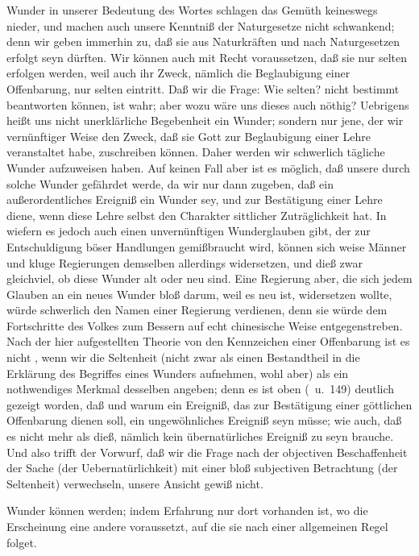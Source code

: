  Wunder in unserer Bedeutung des Wortes schlagen das Gemüth keineswegs nieder, und machen auch unsere Kenntniß der Naturgesetze nicht schwankend; denn wir geben immerhin zu, daß sie aus Naturkräften und nach Naturgesetzen erfolgt seyn dürften. Wir können auch mit Recht voraussetzen, daß sie nur selten erfolgen werden, weil auch ihr Zweck, nämlich die Beglaubigung einer Offenbarung, nur selten eintritt. Daß wir die Frage: Wie selten? nicht bestimmt beantworten können, ist wahr; aber wozu wäre uns dieses auch nöthig? Uebrigens heißt uns nicht  unerklärliche Begebenheit ein Wunder; sondern nur jene, der wir vernünftiger Weise den Zweck, daß sie Gott zur Beglaubigung einer Lehre veranstaltet habe, zuschreiben können. Daher werden wir schwerlich tägliche Wunder aufzuweisen haben. Auf keinen Fall aber ist es möglich, daß unsere  durch solche Wunder gefährdet werde, da wir nur dann zugeben, daß ein außerordentliches Ereigniß ein Wunder sey, und zur Bestätigung einer Lehre diene, wenn diese Lehre selbst den Charakter sittlicher Zuträglichkeit hat. In wiefern es jedoch auch einen unvernünftigen Wunderglauben gibt, der zur Entschuldigung böser Handlungen gemißbraucht wird, können sich weise Männer und kluge Regierungen demselben allerdings widersetzen, und dieß zwar gleichviel, ob diese Wunder alt oder neu sind. Eine Regierung aber, die sich jedem Glauben an ein neues Wunder bloß darum, weil es neu ist, widersetzen wollte, würde schwerlich den Namen einer  Regierung verdienen, denn sie würde dem Fortschritte des Volkes zum Bessern auf echt chinesische Weise entgegenstreben. Nach der hier aufgestellten Theorie von den Kennzeichen einer Offenbarung ist es nicht , wenn wir die Seltenheit (nicht zwar als einen Bestandtheil in die Erklärung des Begriffes eines Wunders aufnehmen, wohl aber) als ein nothwendiges Merkmal desselben angeben; denn es ist oben (\ u.\ 149) deutlich gezeigt worden, daß und warum ein Ereigniß, das zur Bestätigung einer göttlichen Offenbarung dienen soll, ein ungewöhnliches Ereigniß seyn müsse; wie auch, daß es nicht mehr als dieß, nämlich kein übernatürliches Ereigniß zu seyn brauche. Und also trifft der Vorwurf, daß wir die Frage nach der objectiven Beschaffenheit der Sache (der Uebernatürlichkeit) mit einer bloß subjectiven Betrachtung (der Seltenheit) verwechseln, unsere Ansicht gewiß nicht.\par
{} Wunder können  werden; indem Erfahrung nur dort vorhanden ist, wo die Erscheinung eine andere voraussetzt, auf die sie nach einer allgemeinen Regel folget.\par

